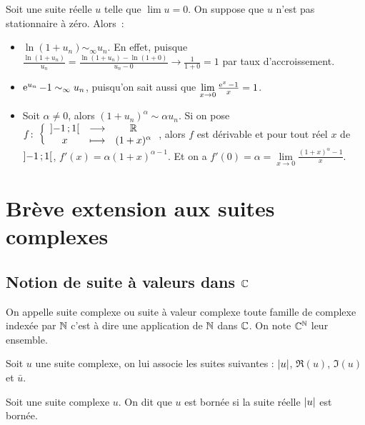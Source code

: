          Soit une suite réelle \(u\) telle que \(\lim u = 0\). On suppose que 
          \(u\) n'est pas stationnaire à zéro. Alors~:
          \begin{itemize}
            \item \(\ln(1+u_n) \sim_\infty u_n\). En effet, puisque 
              \(\frac{\ln(1+u_n)}{u_n}= \frac{\ln(1+u_n) - \ln(1+0)}{u_n-0} \to 
              \frac{1}{1+0} =1\) par taux d'accroissement.  \item \(\operatorname{e}^{u_n}-1 
              \sim_\infty u_n\), puisqu'on sait aussi que \(\lim\limits_{x \to 
              0} \frac{\operatorname{e}^{x}-1}{x} = 1\).
            \item Soit \(\alpha \neq 0\), alors \((1+u_n)^\alpha \sim \alpha 
              u_n\). Si on pose 
              \(f\colon \left\{\begin{array}{ccc} \left] -1 \, ;  1 \right[ & \longrightarrow &\mathbb{R}\\ x & \longmapsto & (1+x)^\alpha \end{array} \right.\), alors 
              \(f\) est dérivable et pour tout réel \(x\) de 
              \(\left] -1 \, ;  1 \right[\), \(f'(x) = \alpha(1+x)^{\alpha -1}\). Et 
              on a \(f'(0) = \alpha = \lim\limits_{x \to 
              0}\frac{(1+x)^\alpha-1}{x}\).
          \end{itemize}

          \section{Brève extension aux suites complexes}

          \subsection{Notion de suite à valeurs dans \(\mathbb{C}\)}

          \begin{defdef}
            On appelle suite complexe ou suite à valeur complexe toute famille 
            de complexe indexée par \(\mathbb{N}\) c'est à dire une application de 
            \(\mathbb{N}\) dans \(\mathbb{C}\). On note \(\mathbb{C}^{\mathbb{N}}\) leur ensemble.
          \end{defdef}
          \begin{defdef}
            Soit \(u\) une suite complexe, on lui associe les suites suivantes : 
            \(\left\lvert u\right\rvert\), \(\Re(u)\), \(\Im(u)\) et \(\bar{u}\).
          \end{defdef}
          \begin{defdef}
            Soit une suite complexe \(u\). On dit que \(u\) est bornée si la 
            suite réelle \(\left\lvert u\right\rvert\) est bornée.
          \end{defdef}

